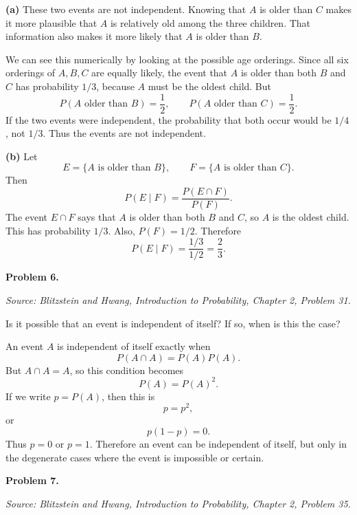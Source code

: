 \documentclass[11pt]{article}
\newcommand{\source}[1]{%
    \vspace{0.15cm}
    {\small\textit{Source: Blitzstein and Hwang, \textit{Introduction to Probability}, Chapter 2, Problem #1.}}
}
\begin{document}
\begin{solutionbox}
\textbf{(a)} These two events are not independent. Knowing that $A$ is older than $C$ makes it more plausible that $A$ is relatively old among the three children. That information also makes it more likely that $A$ is older than $B$.

We can see this numerically by looking at the possible age orderings. Since all six orderings of $A,B,C$ are equally likely, the event that $A$ is older than both $B$ and $C$ has probability $1/3$, because $A$ must be the oldest child. But
\[
P(A\text{ older than }B)=\frac12,
\qquad
P(A\text{ older than }C)=\frac12.
\]
If the two events were independent, the probability that both occur would be $1/4$, not $1/3$. Thus the events are not independent.




\textbf{(b)} Let
\[
E=\{A\text{ is older than }B\},
\qquad
F=\{A\text{ is older than }C\}.
\]
Then
\[
P(E\mid F)=\frac{P(E\cap F)}{P(F)}.
\]
The event $E\cap F$ says that $A$ is older than both $B$ and $C$, so $A$ is the oldest child. This has probability $1/3$. Also, $P(F)=1/2$. Therefore
\[
P(E\mid F)
=
\frac{1/3}{1/2}
=
\frac23.
\]

\end{solutionbox}
\newpage


\begin{problemheader}
\textbf{Problem 6. }
\end{problemheader}
\source{31}

Is it possible that an event is independent of itself? If so, when is this the case?

\begin{solutionbox}
An event $A$ is independent of itself exactly when
\[
P(A\cap A)=P(A)P(A).
\]
But $A\cap A=A$, so this condition becomes
\[
P(A)=P(A)^2.
\]
If we write $p=P(A)$, then this is
\[
p=p^2,
\]
or
\[
p(1-p)=0.
\]
Thus $p=0$ or $p=1$. Therefore an event can be independent of itself, but only in the degenerate cases where the event is impossible or certain.


\end{solutionbox}
\newpage


\begin{problemheader}
\textbf{Problem 7.}
\end{problemheader}
\source{35}
\end{document}
